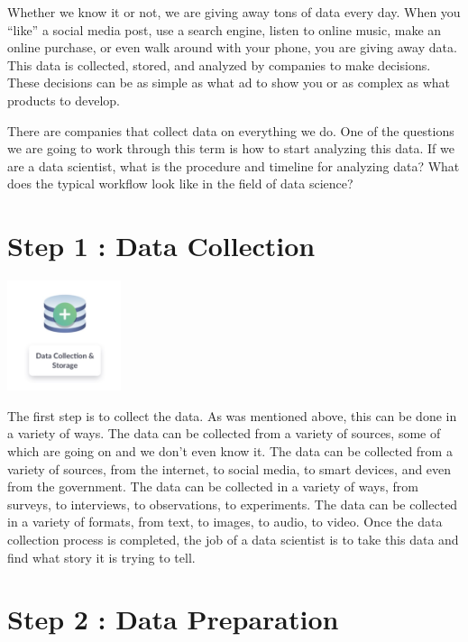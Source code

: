 \documentclass[
  letterpaper,
  DIV=11,
  numbers=noendperiod]{scrreprt}
\begin{document}
Whether we know it or not, we are giving away tons of data every day.
When you ``like'' a social media post, use a search engine, listen to
online music, make an online purchase, or even walk around with your
phone, you are giving away data. This data is collected, stored, and
analyzed by companies to make decisions. These decisions can be as
simple as what ad to show you or as complex as what products to develop.

There are companies that collect data on everything we do. One of the
questions we are going to work through this term is how to start
analyzing this data. If we are a data scientist, what is the procedure
and timeline for analyzing data? What does the typical workflow look
like in the field of data science?

\section*{Step 1 : Data Collection}\label{step-1-data-collection}


\includegraphics[width=0.25\textwidth,height=\textheight]{./images/WIDS-3.jpg}

The first step is to collect the data. As was mentioned above, this can
be done in a variety of ways. The data can be collected from a variety
of sources, some of which are going on and we don't even know it. The
data can be collected from a variety of sources, from the internet, to
social media, to smart devices, and even from the government. The data
can be collected in a variety of ways, from surveys, to interviews, to
observations, to experiments. The data can be collected in a variety of
formats, from text, to images, to audio, to video. Once the data
collection process is completed, the job of a data scientist is to take
this data and find what story it is trying to tell.

\section*{Step 2 : Data Preparation}\label{step-2-data-preparation}
\end{document}
